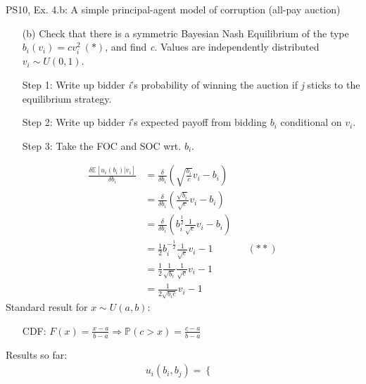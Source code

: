 \begin{frame}{PS10, Ex. 4.b: A simple principal-agent model of corruption (all-pay auction)}
    \begin{itemize}
      \item[(b)] Check that there is a symmetric Bayesian Nash Equilibrium of the type $b_i(v_i) = cv_i^2\ (*)$, and find \textit{c}. Values are independently distributed $v_i\sim U(0, 1)$.
    \end{itemize} \vspace{-8pt}
    \begin{multicols}{2}
      \begin{itemize}
        \item[Step 1:] Write up bidder \textit{i}'s probability of winning the auction if \textit{j} sticks to the equilibrium strategy.
        \item[Step 2:] Write up bidder \textit{i}'s expected payoff from bidding $b_i$ conditional on $v_i$.
        \item[Step 3:] Take the FOC and SOC wrt. $b_i$.
      \end{itemize} \vspace{-8pt}
      \begin{align*}
        \frac{\delta\mathbb{E}[u_i(b_i)|v_i]}{\delta b_i}
          &=\frac{\delta}{\delta b_i}\left(\sqrt{\frac{b_i}{c}}v_i-b_i\right)\\
          &=\frac{\delta}{\delta b_i}\left(\frac{\sqrt{b_i}}{\sqrt{c}}v_i-b_i\right)\\
          &=\frac{\delta}{\delta b_i}\left(b_i^{\frac{1}{2}}\frac{1}{\sqrt{c}}v_i-b_i\right)\\
          &=\frac{1}{2}b_i^{-\frac{1}{2}}\frac{1}{\sqrt{c}}v_i-1&&(**)\\
          &=\frac{1}{2}\frac{1}{\sqrt{b_i}}\frac{1}{\sqrt{c}}v_i-1\\
          &=\frac{1}{2\sqrt{b_ic}}v_i-1
      \end{align*}
      \vfill\null\columnbreak
      Standard result for $x\sim U(a, b):$ \vspace{-6pt}
      \begin{itemize}
        \item[CDF:] $F(x)=\frac{x-a}{b-a}\Rightarrow\mathbb{P}(c>x)=\frac{c-a}{b-a}$
      \end{itemize}
      \vspace{-6pt}
      Results so far: \vspace{-6pt}
      \begin{align*}
        u_i(b_i,b_j)=\left\{\begin{array}{lcl}

\end{array}
\end{align*}
\end{multicols}
\end{frame}
